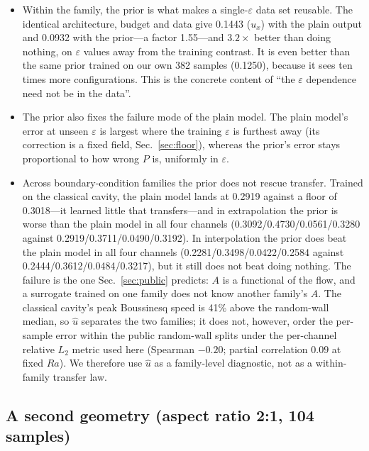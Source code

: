\documentclass[preprint,11pt,a4paper,times,doubleblind]{elsarticle}
\begin{document}
\begin{itemize}
\item Within the family, the prior is what makes a single-$\varepsilon$ data set reusable.
The identical architecture, budget and data give 0.1443 ($u_x$) with the plain output and 0.0932
with the prior---a factor 1.55---and $3.2\times$ better than doing nothing, on $\varepsilon$ values away from the training contrast. It is even better than the same prior trained on our own 382 samples
(0.1250), because it sees ten times more configurations. This is the concrete content of ``the
$\varepsilon$ dependence need not be in the data''.
\item The prior also fixes the failure mode of the plain model. The plain model's error at
unseen $\varepsilon$ is largest where the training $\varepsilon$ is furthest away (its correction
is a fixed field, Sec.~\ref{sec:floor}), whereas the prior's error stays proportional to how wrong
$P$ is, uniformly in $\varepsilon$.
\item Across boundary-condition families the prior does not rescue transfer. Trained on the
classical cavity, the plain model lands at 0.2919 against a floor of 0.3018---it learned little that
transfers---and in extrapolation the prior is worse than the plain model in all four channels
(0.3092/0.4730/0.0561/0.3280 against 0.2919/0.3711/0.0490/0.3192). In interpolation the prior does
beat the plain model in all four channels (0.2281/0.3498/0.0422/0.2584 against
0.2444/0.3612/0.0484/0.3217), but it still does not beat doing nothing. The failure is the one
Sec.~\ref{sec:public} predicts: $A$ is a functional of the flow, and a surrogate trained on one
family does not know another family's $A$. The classical cavity's peak Boussinesq speed is 41\%
above the random-wall median, so $\hat u$ separates the two families; it does not, however, order
the per-sample error within the public random-wall splits under the per-channel relative $L_2$
metric used here (Spearman $-0.20$; partial correlation $0.09$ at fixed $Ra$). We therefore use
$\hat u$ as a family-level diagnostic, not as a within-family transfer law.
\end{itemize}

\subsection{A second geometry (aspect ratio 2:1, 104 samples)}
\label{sec:aspect}
\end{document}
